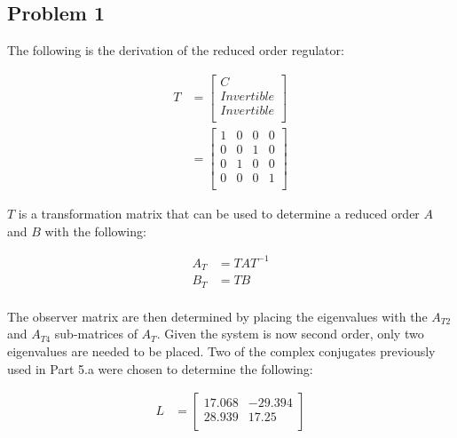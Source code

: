 \documentclass[12pt, letterpaper, onecolumn]{article}
\begin{document}
\subsection*{Problem 1}
The following is the derivation of the reduced order regulator:

\begin{equation*}
    \begin{split}
        T & =
        \begin{bmatrix}
            C          \\
            Invertible \\
            Invertible \\
        \end{bmatrix} \\
        & =
        \begin{bmatrix}
            1 & 0 & 0 & 0 \\
            0 & 0 & 1 & 0 \\
            0 & 1 & 0 & 0 \\
            0 & 0 & 0 & 1 \\
        \end{bmatrix}
    \end{split}
\end{equation*}

$T$ is a transformation matrix that can be used to determine a reduced order $A$ and $B$ with the following:

\begin{equation*}
    \begin{split}
        A_T & = TAT^{-1} \\
        B_T& = TB \\
    \end{split}
\end{equation*}

The observer matrix are then determined by placing the eigenvalues with the $A_{T2}$ and $A_{T4}$ sub-matrices of $A_T$. Given the system is now second order, only two eigenvalues are needed to be placed. Two of the complex conjugates previously used in Part 5.a were chosen to determine the following:

\begin{equation*}
    \begin{split}
        L & =
        \begin{bmatrix}
            17.068 & -29.394 \\
            28.939 & 17.25   \\
        \end{bmatrix}
    \end{split}
\end{equation*}
\end{document}
